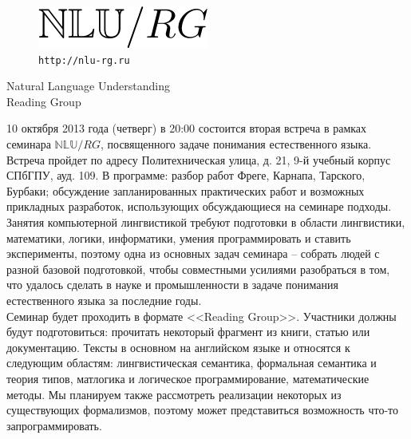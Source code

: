 \documentclass[12pt]{article}
\begin{document}
\baselineskip 24pt

\parindent 0cm

\begin{figure}
  \begin{center}
    \includegraphics[scale=0.70]{nlu-rg-logo.png}\\
    \bigskip
    \texttt{\Large http://nlu-rg.ru}
  \end{center}
\end{figure}

\begin{center}
{\rm \Huge{Natural Language Understanding}}\\
\bigskip
{\rm \Large Reading Group}
\end{center}

\bigskip
\bigskip

\baselineskip 15pt

10 октября 2013 года (четверг) в 20:00 состоится вторая встреча в рамках семинара $\mathbb{NLU}/RG$, посвященного задаче понимания естественного языка. Встреча пройдет по адресу Политехническая улица, д. 21, 9-й учебный корпус СПбГПУ, ауд. 109. В программе: разбор работ Фреге, Карнапа, Тарского, Бурбаки; обсуждение запланированных практических работ и возможных прикладных разработок, использующих обсуждающиеся на семинаре подходы.\\

Занятия компьютерной лингвистикой требуют подготовки в области лингвистики, математики, логики, информатики, умения программировать и ставить эксперименты, поэтому одна из основных задач семинара -- собрать людей с разной базовой подготовкой, чтобы совместными усилиями разобраться в том, что удалось сделать в науке и промышленности в задаче понимания естественного языка за последние годы.\\

Семинар будет проходить в формате <<Reading Group>>. Участники должны будут подготовиться: прочитать некоторый фрагмент из книги, статью или документацию. Тексты в основном на английском языке и относятся к следующим областям: лингвистическая семантика, формальная семантика и теория типов, матлогика и логическое программирование, математические методы. Мы планируем также рассмотреть реализации некоторых из существующих формализмов, поэтому может представиться возможность что-то запрограммировать.\\
\end{document}
